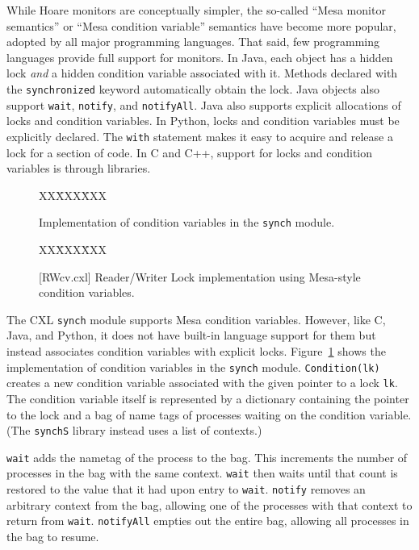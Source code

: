 \documentclass{report}
\newcommand{\cxlsource}[1]{
\begin{tabbing}
XX\=XXX\=XXX\kill
    
\end{tabbing}
}
\newenvironment{code}{
\tcolorbox
}{
\endtcolorbox
}
\begin{document}
While Hoare monitors are conceptually simpler, the so-called
``Mesa monitor semantics'' or ``Mesa condition variable'' semantics
have become more popular, adopted by all major
programming languages.
That said, few programming languages provide full support for monitors.
In Java, each object has a hidden lock \emph{and} a hidden condition variable
associated with it.
Methods declared with the \texttt{synchronized} keyword automatically
obtain the lock.  Java objects also support \texttt{wait}, \texttt{notify},
and \texttt{notifyAll}.  Java also supports explicit allocations of locks
and condition variables.
In Python, locks and condition variables must be explicitly declared.
The \texttt{with} statement makes it easy to acquire and release a lock
for a section of code.
In C and C++, support for locks and condition variables is through libraries.


\begin{figure}
\cxlsource{mesa}
\caption{Implementation of condition variables in the \texttt{synch} module.}
\label{fig:cv}
\end{figure}

\begin{figure}
\begin{code}
\cxlsource{RWcv}
\end{code}
\caption{[RWcv.cxl] Reader/Writer Lock implementation using Mesa-style condition variables.}
\label{fig:RWcv}
\end{figure}

The CXL \texttt{synch} module supports Mesa condition variables.
However, like C, Java, and Python,
it does not have built-in language support for them but instead associates condition variables
with explicit locks.
Figure~\ref{fig:cv} shows the implementation of
condition variables in the \texttt{synch} module.
\texttt{Condition(lk)} creates a new condition variable associated with the given pointer
to a lock \texttt{lk}.
The condition variable itself is represented by a dictionary containing the pointer to the lock
and a bag of name tags of processes waiting on the condition variable.
(The \texttt{synchS} library instead uses a list of contexts.)

\texttt{wait} adds the nametag of the process to the bag.  This increments the number of processes
in the bag with the same context.  \texttt{wait} then waits until that count is restored to the
value that it had upon entry to \texttt{wait}.  \texttt{notify} removes an arbitrary context from
the bag, allowing one of the processes with that context to return from \texttt{wait}.
\texttt{notifyAll} empties out the entire bag, allowing all processes in the bag to resume.
\end{document}
